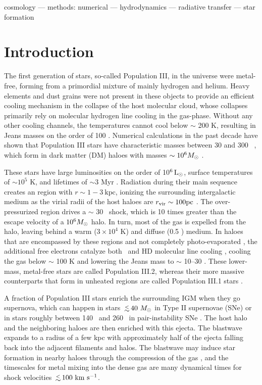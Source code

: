 \documentclass[useAMS,usenatbib]{mn2e}
\begin{document}
\begin{keywords}
  cosmology --- methods: numerical --- hydrodynamics ---
  radiative transfer --- star formation
\end{keywords}

\section{Introduction}

The first generation of stars, so-called Population III, in the
universe were metal-free, forming from a primordial mixture of mainly
hydrogen and helium.  Heavy elements and dust grains were not present
in these objects to provide an efficient cooling mechanism in the
collapse of the host molecular cloud, whose collapses primarily rely
on molecular hydrogen line cooling in the gas-phase.  Without any
other cooling channels, the temperatures cannot cool below $\sim$ 200
K, resulting in Jeans masses on the order of 100 \Ms.  Numerical
calculations in the past decade have shown that Population III stars
have characteristic masses between 30 and 300
\Ms~\citep[e.g.][]{ABN02, Bromm02_P3, OShea07a}, which form in dark
matter (DM) haloes with masses $\sim 10^6 \Ms$
\citep[e.g.][]{MacLow86, Shapiro87, Tegmark97}.

These stars have large luminosities on the order of 10$^6 {\rm\,L_\odot}$,
surface temperatures of $\sim 10^5$ K, and lifetimes of $\sim3$ Myr
\citep{Bond84, Schaerer02}.  Radiation during their main sequence
creates an \hii region with $r \sim 1-3~\mathrm{kpc}$, ionizing the
surrounding intergalactic medium as the virial radii of the host haloes
are $r_{\rm vir} \sim 100 \mathrm{pc}$ \citep{Whalen04, Kitayama04,
  Alvarez06, Abel07}.  The over-pressurized \hii region drives a
$\sim$ 30 \kms~shock, which is 10 times greater than the escape
velocity of a $10^6 \Ms$ halo.  In turn, most of the gas is expelled
from the halo, leaving behind a warm ($3 \times 10^4$ K) and diffuse
(0.5 \cubecm) medium.  In haloes that are encompassed by these \hii
regions and not completely photo-evaporated \citep{refs}, the
additional free electrons catalyze both \hh~and HD molecular line
cooling \citep{OShea05, Johnson06, Yoshida07, McGreer08}, cooling the
gas below $\sim$ 100 K and lowering the Jeans mass to $\sim$ 10--30
\Ms.  These lower-mass, metal-free stars are called Population III.2,
whereas their more massive counterparts that form in unheated regions
are called Population III.1 stars \citep{Norman08}.

A fraction of Population III stars enrich the surrounding IGM when
they go supernova, which can happen in stars $\lsim 40~\Ms$ in Type II
supernovae (SNe) or in stars roughly between 140 \Ms~and 260 \Ms~in
pair-instability SNe \citep[PISNe;][]{2002ApJ...567..532H}. The host
halo and the neighboring haloes are then enriched with this ejecta.
The blastwave expands to a radius of a few kpc \citep{Bromm03_SN,
  Wise08_Gal, Greif10} with approximately half of the ejecta falling
back into the adjacent filaments and halos.  The blastwave may induce
star formation in nearby haloes through the compression of the gas
\citep{Ferrara98, more}, and the timescales for metal mixing into the
dense gas are many dynamical times \citep{Cen08} for shock velocities
$\lsim 100~\kms$.
\end{document}
